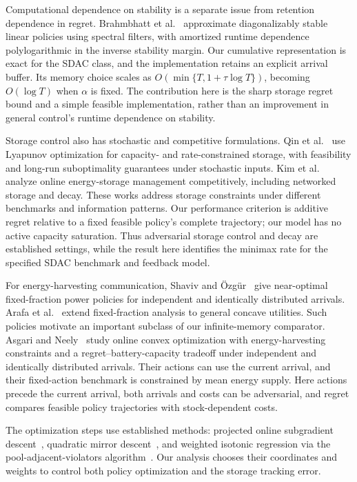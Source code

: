 \documentclass[11pt]{article}
\begin{document}
Computational dependence on stability is a separate issue from
retention dependence in regret. Brahmbhatt
et al.~\cite{brahmbhatt2026spectral} approximate diagonalizably stable
linear policies using spectral filters, with amortized runtime
dependence polylogarithmic in the inverse stability margin. Our
cumulative representation is exact for the SDAC class, and the
implementation retains an explicit arrival buffer. Its memory choice
scales as $O(\min\{T,1+\tau\log T\})$, becoming $O(\log T)$ when
$\alpha$ is fixed. The contribution here is the sharp storage regret
bound and a simple feasible implementation, rather than an improvement
in general control's runtime dependence on stability.

Storage control also has stochastic and competitive formulations.
Qin et al.~\cite{qin2016storage} use Lyapunov optimization for
capacity- and rate-constrained storage, with feasibility and long-run
suboptimality guarantees under stochastic inputs. Kim
et al.~\cite{kim2016storage} analyze online energy-storage management
competitively, including networked storage and decay. These works
address storage constraints under different benchmarks and information
patterns. Our performance criterion is additive regret relative to a
fixed feasible policy's complete trajectory; our model has no active
capacity saturation. Thus adversarial storage control and decay are
established settings, while the result here identifies the minimax
rate for the specified SDAC benchmark and feedback model.

For energy-harvesting communication, Shaviv and
\"Ozg\"ur~\cite{shaviv2016universally} give near-optimal fixed-fraction
power policies for independent and identically distributed arrivals.
Arafa et al.~\cite{arafa2018online} extend fixed-fraction
analysis to general concave utilities. Such policies motivate an
important subclass of our infinite-memory comparator. Asgari and
Neely~\cite{asgari2020bregman} study online convex optimization with
energy-harvesting constraints and a regret--battery-capacity tradeoff
under independent and identically distributed arrivals. Their actions
can use the current arrival, and their fixed-action benchmark is
constrained by mean energy supply. Here actions precede the current
arrival, both arrivals and costs can be adversarial, and regret compares
feasible policy trajectories with stock-dependent costs.

The optimization steps use established methods: projected online
subgradient descent~\cite{zinkevich2003online}, quadratic mirror
descent~\cite{beck2003mirror}, and weighted isotonic regression via
the pool-adjacent-violators algorithm~\cite{best1990isotonic}.
Our analysis chooses their coordinates and weights to control both
policy optimization and the storage tracking error.
\end{document}
